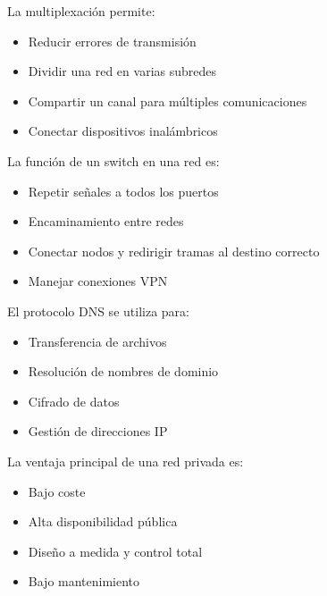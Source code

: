 \documentclass[11pt]{article}
\begin{document}
La multiplexación permite:

\begin{itemize}
\item Reducir errores de transmisión

\item Dividir una red en varias subredes

\item Compartir un canal para múltiples comunicaciones

\item Conectar dispositivos inalámbricos
\end{itemize}

La función de un switch en una red es:

\begin{itemize}
\item Repetir señales a todos los puertos

\item Encaminamiento entre redes

\item Conectar nodos y redirigir tramas al destino correcto

\item Manejar conexiones VPN
\end{itemize}

El protocolo DNS se utiliza para:

\begin{itemize}
\item Transferencia de archivos

\item Resolución de nombres de dominio

\item Cifrado de datos

\item Gestión de direcciones IP
\end{itemize}

La ventaja principal de una red privada es:

\begin{itemize}
\item Bajo coste

\item Alta disponibilidad pública

\item Diseño a medida y control total

\item Bajo mantenimiento
\end{itemize}
\end{document}
